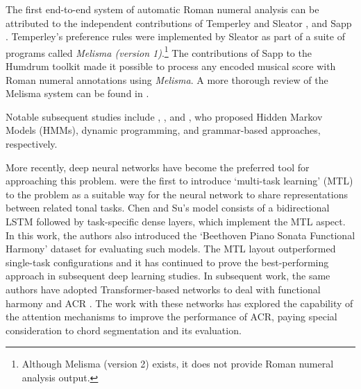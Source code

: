 

The first end-to-end system of automatic Roman numeral
analysis can be attributed to the independent contributions
of Temperley and Sleator \parencite{temperley2004cognition},
and Sapp \parencite{sapp2009tsroot}. Temperley's preference
rules were implemented by Sleator as part of a suite of
programs called \emph{Melisma (version
1)}.\footnote{Although Melisma (version 2) exists, it does
not provide Roman numeral analysis output.} The
contributions of Sapp to the Humdrum toolkit
\parencite{huron2002music} made it possible to process any
encoded musical score with Roman numeral annotations using
\emph{Melisma}. A more thorough review of the Melisma system
can be found in \textcite{napoleslopez2017automatic}.

Notable subsequent studies include
\textcite{raphael2004functional},
\textcite{illescas2007harmonic}, and
\textcite{magalhaes2011functional}, who proposed Hidden
Markov Models (HMMs), dynamic programming, and grammar-based
approaches, respectively.

More recently, deep neural networks have become the
preferred tool for approaching this problem.
\textcite{chen2018functional} were the first to introduce
`multi-task learning' (MTL) \parencite{ruder2017overview} to
the problem as a suitable way for the neural network to
share representations between related tonal tasks. Chen and
Su's model consists of a bidirectional LSTM
\parencite{hochreiter1997long} followed by task-specific
dense layers, which implement the MTL aspect. In this work,
the authors also introduced the `Beethoven Piano Sonata
Functional Harmony' dataset for evaluating such models. The
MTL layout outperformed single-task configurations and it
has continued to prove the best-performing approach in
subsequent deep learning studies. In subsequent work, the
same authors have adopted Transformer-based networks to deal
with functional harmony and ACR \parencite{chen2019harmony,
chen2021attend}. The work with these networks has explored
the capability of the attention mechanisms to improve the
performance of ACR, paying special consideration to chord
segmentation and its evaluation.

